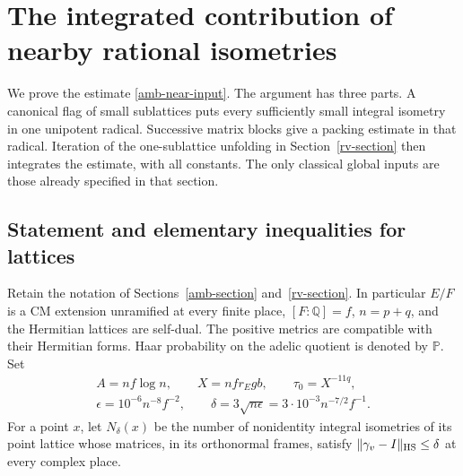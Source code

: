 \section{The integrated contribution of nearby rational isometries}
\label{nu-section}

We prove the estimate \eqref{amb-near-input}.  The argument
has three parts.  A canonical flag of small sublattices
puts every sufficiently small integral isometry in one
unipotent radical.  Successive matrix blocks give a
packing estimate in that radical.  Iteration of the
one-sublattice unfolding in Section~\ref{rv-section}
then integrates the estimate, with all constants.
The only classical global inputs are those already
specified in that section.

\subsection{Statement and elementary inequalities for lattices}

Retain the notation of Sections~\ref{amb-section}
and~\ref{rv-section}.  In particular $E/F$ is a
CM extension unramified at every finite place,
$[F:\mathbb Q]=f$, $n=p+q$, and the Hermitian lattices
are self-dual.  The positive metrics are compatible
with their Hermitian forms.  Haar probability on the
adelic quotient is denoted by $\mathbb P$.
Set
\begin{equation}\label{nu-parameters}
 \begin{gathered}
 A=nf\log n,\qquad X=nfr_Egb,\qquad
 \tau_0=X^{-11q},\\
 \epsilon=10^{-6}n^{-8}f^{-2},\qquad
 \delta=3\sqrt{n\epsilon}
                =3\cdot10^{-3}n^{-7/2}f^{-1}.
 \end{gathered}
\end{equation}
For a point $x$, let $N_\delta(x)$ be the number of
nonidentity integral isometries of its point lattice
whose matrices, in its orthonormal frames, satisfy
$\|\gamma_v-I\|_{\rm HS}\le\delta$ at every complex place.

